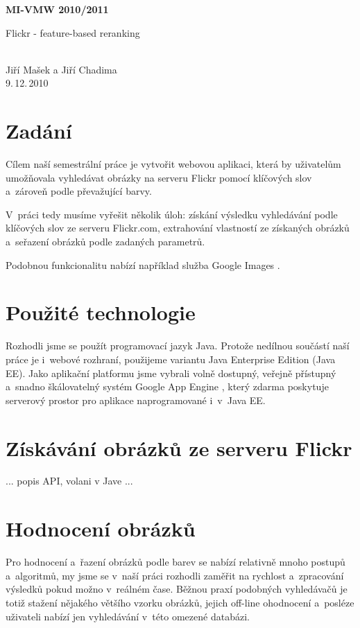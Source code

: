 \documentclass[12pt,oneside,a4paper]{article}
\begin{document}
\begin{center}
\bf MI-VMW 2010/2011\\[2mm]
    \begin{Large}Flickr - feature-based reranking\end{Large}\\[3mm]
       Jiří Mašek a Jiří Chadima\\
9.\,12.\,2010
\end{center}

\section{Zadání}
Cílem naší semestrální práce je vytvořit webovou aplikaci, která by uživatelům umožňovala vyhledávat obrázky na serveru Flickr \cite{flickr} pomocí klíčových slov a~zároveň podle převažující barvy.

V~práci tedy musíme vyřešit několik úloh: získání výsledku vyhledávání podle klíčových slov ze serveru Flickr.com, extrahování vlastností ze získaných obrázků a~seřazení obrázků podle zadaných parametrů.

Podobnou funkcionalitu nabízí například služba Google Images \cite{GoogleImages}.

\section{Použité technologie}

Rozhodli jsme se použít programovací jazyk Java. Protože nedílnou součástí naší práce je i~webové rozhraní, použijeme variantu Java Enterprise Edition (Java EE). Jako aplikační platformu jsme vybrali volně dostupný, veřejně přístupný a~snadno škálovatelný systém Google App Engine \cite{GoogleAE}, který zdarma poskytuje serverový prostor pro aplikace naprogramované i~v~Java EE.

\section{Získávání obrázků ze serveru Flickr}

... popis API, volani v Jave ...

\section{Hodnocení obrázků}
Pro hodnocení a~řazení obrázků podle barev se nabízí relativně mnoho postupů a~algoritmů, my jsme se v~naší práci rozhodli zaměřit na rychlost a~zpracování výsledků pokud možno v~reálném čase. Běžnou praxí podobných vyhledávačů je totiž stažení nějakého většího vzorku obrázků, jejich off-line ohodnocení a~posléze uživateli nabízí jen vyhledávání v~této omezené databázi.
\end{document}

